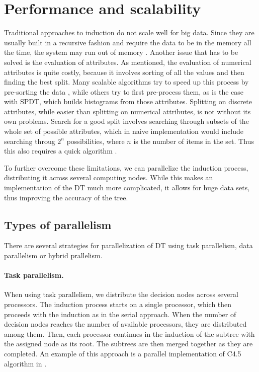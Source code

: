 \documentclass[thesis=B,english]{FITthesis}[2012/10/20]
\begin{document}
		\section{Performance and scalability}
		Traditional approaches to induction do not scale well for big data. Since they are usually built in a recursive fashion and require the data to be in the memory all the time, the system may run out of memory \cite{SCALABLE_RDF}. Another issue that has to be solved is the evaluation of attributes. As mentioned, the evaluation of numerical attributes is quite costly, because it involves sorting of all the values and then finding the best split. Many scalable algorithms try to speed up this process by pre-sorting the data \cite{mehta1996sliq,shafer1996sprint}, while others try to first pre-process them, as is the case with SPDT, which builds histograms from those attributes\cite{ben2010streaming}. Splitting on discrete attributes, while easier than splitting on numerical attributes, is not without its own problems. Search for a good split involves searching through subsets of the whole set of possible attributes, which in naive implementation would include searching throug \(2^n\) possibilities, where \(n\) is the number of items in the set. Thus this also requires a quick algorithm \cite{mehta1996sliq}.

		To further overcome these limitations, we can parallelize the induction process, distributing it across several computing nodes. While this makes an implementation of the DT much more complicated, it allows for huge data sets, thus improving the accuracy of the tree.

		\subsection{Types of parallelism}
		There are several strategies for parallelization of DT using task parallelism, data parallelism or hybrid prallelism. \cite{PARALLEL_IMPLEMENTATION}
		\paragraph*{Task parallelism.} When using task parallelism, we distribute the decision nodes across several processors. The induction process starts on a single processor, which then proceeds with the induction as in the serial approach. When the number of decision nodes reaches the number of available processors, they are distributed among them. Then, each processor continues in the induction of the subtree with the assigned node as its root. The subtrees are then merged together as they are completed. An example of this approach is a parallel implementation of C4.5 algorithm in \cite{PARALLEL_INDUCTION}. 
\end{document}
